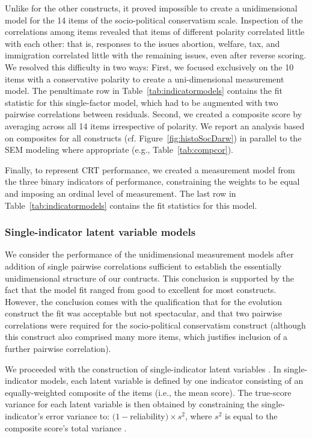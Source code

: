 \documentclass[fignum,man]{apa}\usepackage[]{graphicx}\usepackage[]{color}
\begin{document}
Unlike for the other constructs, it proved impossible to create a unidimensional 
model for the 14 items of the socio-political conservatism scale. Inspection of the correlations among
items revealed that items of different polarity correlated little with each
other: that is, responses to the issues abortion, welfare, tax, and immigration
correlated little with the remaining issues, even after reverse scoring. 
We resolved this difficulty in two ways: First, we focused
exclusively on the 10 items
with a conservative polarity to create 
a uni-dimensional measurement model.
The penultimate row in Table~\ref{tab:indicatormodels} contains the
fit statistic for this single-factor model, which 
had to be augmented with two pairwise correlations between residuals.
Second, 
  we created a composite score by averaging across all 
  14 items irrespective of polarity. 
  We report an analysis based on composites for all constructs (cf. Figure~\ref{fig:histoSocDarw}) 
  in parallel to the SEM modeling where appropriate (e.g., Table~\ref{tab:compcor}).
  
Finally, to represent CRT performance, we created 
a measurement model from the three  
binary indicators of performance, 
constraining the weights to be equal and
imposing an ordinal level of measurement. 
The last row in Table~\ref{tab:indicatormodels} contains the
fit statistics for this model. 

\subsubsection{Single-indicator latent variable models}
We consider the performance of the unidimensional measurement models 
after addition of single pairwise
correlations sufficient to establish the essentially 
unidimensional structure
of our contructs. This conclusion is supported by the
fact that the model fit ranged from good to excellent \cite{Hooper08}
for most constructs. However, the conclusion 
 comes with the qualification that for the evolution
construct the fit was acceptable but not spectacular, and that two pairwise
correlations were required for the socio-political conservatism construct (although this construct
also comprised many more items, which justifies inclusion of a further pairwise correlation). 

We proceeded with the construction of
single-indicator latent variables \cite{Hayduk96,Joreskog82}.
In single-indicator models, each latent variable is defined 
by one indicator consisting of an equally-weighted composite 
of the items (i.e., the mean score).
The true-score variance for each latent variable is then obtained by 
constraining the single-indicator's error variance 
to: $(1 - $reliability$) \times s^2$, 
where $s^2$ is equal to the composite score's total variance \cite{Joreskog82}.
\end{document}
